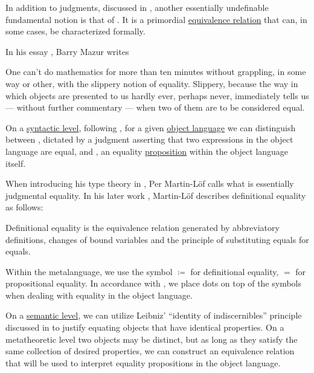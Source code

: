 \begin{concept}\label{con:equality}
  In addition to judgments, discussed in , another essentially undefinable fundamental notion is that of . It is a primordial \hyperref[def:equivalence_relation]{equivalence relation} that can, in some cases, be characterized formally.

  In his essay \cite[\enquote{When is One Thing Equal to Some Other Thing?}, page 222]{GoldSimonsEtAl2008ProofAndOtherDilemmas}, Barry Mazur writes
  \begin{displayquote}
    One can't do mathematics for more than ten minutes without grappling, in some way or other, with the slippery notion of equality. Slippery, because the way in which objects are presented to us hardly ever, perhaps never, immediately tells us --- without further commentary --- when two of them are to be considered equal.
  \end{displayquote}

  On a \hyperref[con:syntax_semantics_duality]{syntactic level}, following \cite[19]{UnivalentProject2024OctoberHoTT}, for a given \hyperref[con:metalogic]{object language} we can distinguish between , dictated by a judgment asserting that two expressions in the object language are equal, and , an equality \hyperref[con:proposition]{proposition} within the object language itself.

  When introducing his type theory in \cite[85]{MartinLöf1984IntuitionisticTypeTheory}, Per Martin-L\"of calls  what is essentially judgmental equality. In his later work \cite[40]{MartinLöf1984IntuitionisticTypeTheory}, Martin-L\"of describes definitional equality as follows:
  \begin{displayquote}
    Definitional equality is the equivalence relation generated by abbreviatory definitions, changes of bound variables and the principle of substituting equals for equals.
  \end{displayquote}

  Within the metalanguage, we use the symbol \( {\coloneqq} \) for definitional equality, \( {=} \) for propositional equality. In accordance with , we place dots on top of the symbols when dealing with equality in the object language.

  On a \hyperref[con:syntax_semantics_duality]{semantic level}, we can utilize Leibniz' \enquote{identity of indiscernibles} principle discussed in  to justify equating objects that have identical properties. On a metatheoretic level two objects may be distinct, but as long as they satisfy the same collection of desired properties, we can construct an equivalence relation that will be used to interpret equality propositions in the object language.
\end{concept}

